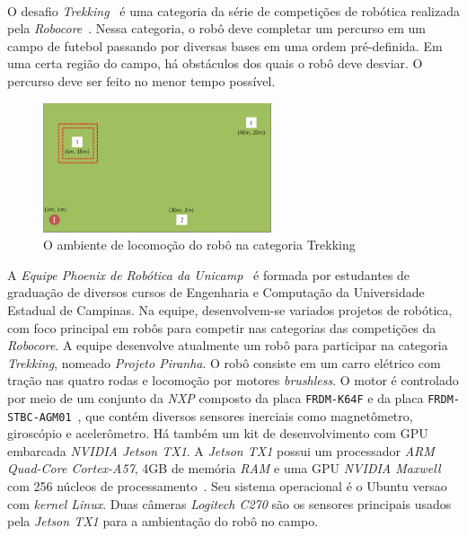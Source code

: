 \documentclass[10pt]{article}
\newcommand{\tit}[1]{\textit{#1}}
\newcommand{\ttt}[1]{\texttt{#1}}
\begin{document}
\paragraph{}
O desafio \tit{Trekking}~\cite{trekking_regras} é uma categoria da série de 
competições de robótica realizada pela \tit{Robocore}~\cite{robocore}. 
Nessa categoria, o robô deve completar um percurso em 
um campo de futebol passando por diversas bases em uma ordem pré-definida.
Em uma certa região do campo, há obstáculos dos quais o robô deve desviar.
O percurso deve ser feito no menor tempo possível.

\begin{figure}[H]
  		\centering
    	\includegraphics[width=0.6\textwidth]{imgs/trekking_campo.png}
		\caption[9pt]{O ambiente de locomoção do robô na categoria Trekking}
\end{figure}

A \emph{Equipe Phoenix de Robótica da Unicamp}~\cite{phoenix} 
é formada por estudantes de graduação de diversos cursos de 
Engenharia e Computação da Universidade Estadual de Campinas. 
Na equipe, desenvolvem-se variados projetos de robótica,
com foco principal em robôs para competir nas categorias das competições da
\tit{Robocore}.  
A equipe desenvolve atualmente um robô para participar na categoria 
\tit{Trekking}, nomeado \tit{Projeto Piranha}. 
O robô consiste em um carro elétrico com tração nas quatro rodas e 
locomoção por motores \tit{brushless}.
O motor é controlado por meio de um conjunto da \tit{NXP} composto da placa
\ttt{FRDM-K64F} e da placa \ttt{FRDM-STBC-AGM01}~\cite{nxp}, que contém 
diversos sensores inerciais como magnetômetro, giroscópio e acelerômetro.
Há também um kit de desenvolvimento com GPU embarcada \tit{NVIDIA Jetson TX1}. 
A \tit{Jetson TX1} possui um processador \tit{ARM Quad-Core Cortex-A57},
4GB de memória \tit{RAM} e uma GPU \tit{NVIDIA Maxwell} com 256 núcleos de
processamento~\cite{tx1}. 
Seu sistema operacional é o Ubuntu versao com \tit{kernel Linux}.
Duas câmeras \tit{Logitech C270} são os sensores
principais usados pela \tit{Jetson TX1} para a ambientação do robô no campo.
\end{document}
